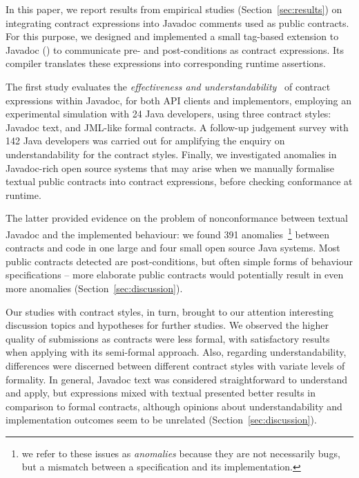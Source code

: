 In this paper, we report results from empirical studies (Section~\ref{sec:results}) on integrating contract expressions into Javadoc comments used as public contracts. 
For this purpose, we designed and implemented a small tag-based extension to Javadoc (\contractjdoc{}) to communicate pre- and post-conditions as contract expressions.
Its compiler translates these expressions into corresponding runtime assertions.

The first study evaluates the \emph{effectiveness and understandability}~\cite{Scalabrino2017} of contract expressions within Javadoc, for both API clients and implementors, employing an experimental simulation with 24 Java developers, using three contract styles: Javadoc text, \contractjdoc{} and JML-like formal contracts. 
A follow-up judgement survey with 142 Java developers was carried out for amplifying the enquiry on understandability for the contract styles. Finally, we investigated anomalies in Javadoc-rich open source systems that may arise when we manually formalise textual public contracts into contract expressions, before checking conformance at runtime.

The latter provided evidence on the problem of nonconformance between textual Javadoc and the implemented behaviour: we found 391 anomalies~\footnote{we refer to these issues as \emph{anomalies} because they are not necessarily bugs, but a mismatch between a specification and its implementation.} between contracts and code in one large and four small open source Java systems. Most public contracts detected are post-conditions, but often simple forms of behaviour specifications -- more elaborate public contracts would potentially result in even more anomalies (Section~\ref{sec:discussion}).

Our studies with contract styles, in turn, brought to our attention interesting discussion topics and hypotheses for further studies. 
We observed the higher quality of submissions as contracts were less formal, with satisfactory results when applying \contractjdoc{} with its semi-formal approach. Also, regarding understandability, differences were discerned between different contract styles with variate levels of formality.
In general, Javadoc text was considered straightforward to understand and apply, but \contractjdoc{} expressions mixed with textual presented better results in comparison to formal contracts, although opinions about understandability and implementation outcomes seem to be unrelated (Section~\ref{sec:discussion}).

